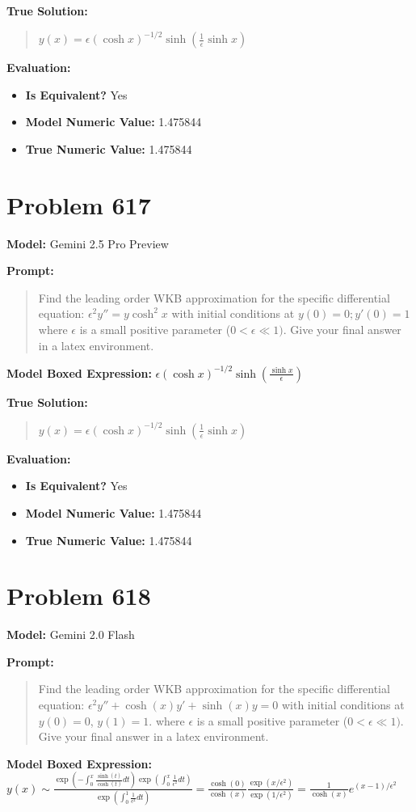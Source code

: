 \documentclass{article}
\begin{document}
\textbf{True Solution:}
\begin{quote}
$y(x) = \epsilon (\cosh x)^{-1/2} \sinh\left( \frac{1}{\epsilon} \sinh x \right)$
\end{quote}

\textbf{Evaluation:}
\begin{itemize}
\item \textbf{Is Equivalent?} Yes
\item \textbf{Model Numeric Value:} 1.475844
\item \textbf{True Numeric Value:} 1.475844
\end{itemize}
\vspace{1cm}
\section*{Problem 617}
\textbf{Model:} Gemini 2.5 Pro Preview

\textbf{Prompt:}
\begin{quote}
Find the leading order WKB approximation for the specific differential equation: $\epsilon^2 y'' = y \cosh^2 x$ with initial conditions at $y(0) = 0; y'(0) = 1$ where $\epsilon$ is a small positive parameter ($0 < \epsilon \ll 1)$. Give your final answer in a \boxed latex environment.
\end{quote}
\textbf{Model Boxed Expression:} $\epsilon (\cosh x)^{-1/2} \sinh\left(\frac{\sinh x}{\epsilon}\right)$

\textbf{True Solution:}
\begin{quote}
$y(x) = \epsilon (\cosh x)^{-1/2} \sinh\left( \frac{1}{\epsilon} \sinh x \right)$
\end{quote}

\textbf{Evaluation:}
\begin{itemize}
\item \textbf{Is Equivalent?} Yes
\item \textbf{Model Numeric Value:} 1.475844
\item \textbf{True Numeric Value:} 1.475844
\end{itemize}
\vspace{1cm}
\section*{Problem 618}
\textbf{Model:} Gemini 2.0 Flash

\textbf{Prompt:}
\begin{quote}
Find the leading order WKB approximation for the specific differential equation: $\epsilon^2 y'' + \cosh(x) y' + \sinh(x) y = 0$ with initial conditions at $y(0) = 0$, $y(1) = 1$. where $\epsilon$ is a small positive parameter ($0 < \epsilon \ll 1)$. Give your final answer in a \boxed latex environment.
\end{quote}
\textbf{Model Boxed Expression:} $y(x) \sim \frac{\exp(-\int_0^x \frac{\sinh(t)}{\cosh(t)} dt) \exp(\int_0^x \frac{1}{\epsilon^2} dt)}{\exp(\int_0^1 \frac{1}{\epsilon^2} dt)} = \frac{\cosh(0)}{\cosh(x)} \frac{\exp(x/\epsilon^2)}{\exp(1/\epsilon^2)} = \frac{1}{\cosh(x)} e^{(x-1)/\epsilon^2}$
\end{document}
